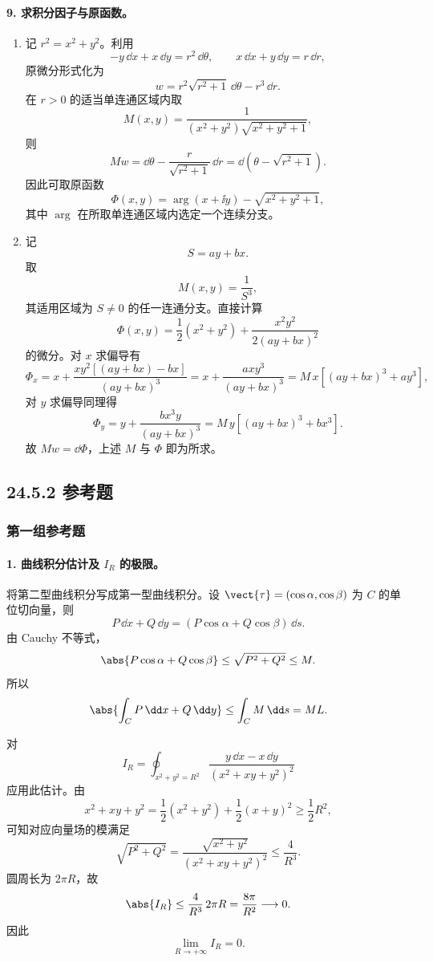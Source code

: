 \paragraph{9. 求积分因子与原函数。}
\begin{xsolution}
\begin{enumerate}[label=(\arabic*)]
\item 记 $r^2=x^2+y^2$。利用
\[
  -y\,\dd x+x\,\dd y=r^2\,\dd\theta,
  \qquad
  x\,\dd x+y\,\dd y=r\,\dd r,
\]
原微分形式化为
\[
  w=r^2\sqrt{r^2+1}\,\dd\theta-r^3\,\dd r.
\]
在 $r>0$ 的适当单连通区域内取
\[
  M(x,y)=\frac1{(x^2+y^2)\sqrt{x^2+y^2+1}},
\]
则
\[
  Mw=\dd\theta-\frac r{\sqrt{r^2+1}}\,\dd r
  =\dd\left(\theta-\sqrt{r^2+1}\right).
\]
因此可取原函数
\[
  \Phi(x,y)=\arg(x+\ii y)-\sqrt{x^2+y^2+1},
\]
其中 $\arg$ 在所取单连通区域内选定一个连续分支。

\item 记
\[
  S=ay+bx.
\]
取
\[
  M(x,y)=\frac1{S^3},
\]
其适用区域为 $S\ne0$ 的任一连通分支。直接计算
\[
  \Phi(x,y)
  =\frac12(x^2+y^2)+\frac{x^2y^2}{2(ay+bx)^2}
\]
的微分。对 $x$ 求偏导有
\[
  \Phi_x
  =x+\frac{xy^2[(ay+bx)-bx]}{(ay+bx)^3}
  =x+\frac{axy^3}{(ay+bx)^3}
  =M\,x[(ay+bx)^3+ay^3],
\]
对 $y$ 求偏导同理得
\[
  \Phi_y
  =y+\frac{bx^3y}{(ay+bx)^3}
  =M\,y[(ay+bx)^3+bx^3].
\]
故 $Mw=\dd\Phi$，上述 $M$ 与 $\Phi$ 即为所求。
\end{enumerate}
\end{xsolution}

\subsection*{24.5.2 参考题}

\subsubsection*{第一组参考题}

\paragraph{1. 曲线积分估计及 $I_R$ 的极限。}
\begin{xsolution}
将第二型曲线积分写成第一型曲线积分。设 $\vect{\tau}=(\cos\alpha,\cos\beta)$ 为 $C$ 的单位切向量，则
\[
  P\,\dd x+Q\,\dd y
  =(P\cos\alpha+Q\cos\beta)\,\dd s.
\]
由 Cauchy 不等式，
\[
  \abs{P\cos\alpha+Q\cos\beta}
  \le\sqrt{P^2+Q^2}\le M.
\]
所以
\[
  \abs{\int_CP\,\dd x+Q\,\dd y}
  \le\int_C M\,\dd s=ML.
\]

对
\[
  I_R=\oint_{x^2+y^2=R^2}
  \frac{y\,\dd x-x\,\dd y}{(x^2+xy+y^2)^2}
\]
应用此估计。由
\[
  x^2+xy+y^2
  =\frac12(x^2+y^2)+\frac12(x+y)^2
  \ge\frac12R^2,
\]
可知对应向量场的模满足
\[
  \sqrt{P^2+Q^2}
  =\frac{\sqrt{x^2+y^2}}{(x^2+xy+y^2)^2}
  \le\frac{4}{R^3}.
\]
圆周长为 $2\pi R$，故
\[
  \abs{I_R}\le\frac4{R^3}\,2\pi R
  =\frac{8\pi}{R^2}\longrightarrow0.
\]
因此
\[
  \lim_{R\to+\infty}I_R=0.
\]
\end{xsolution}

